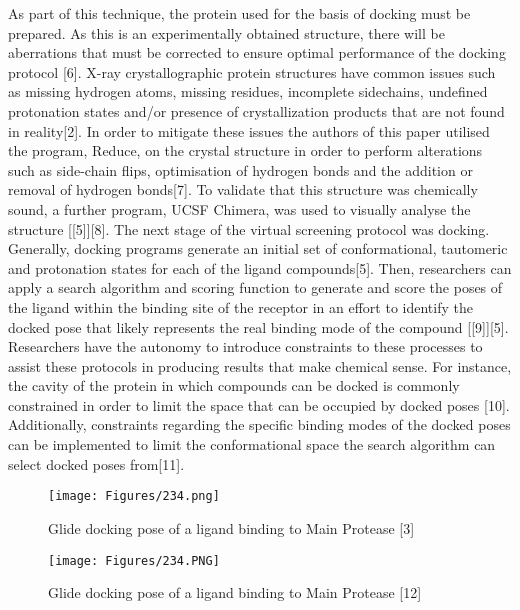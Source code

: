 \documentclass[
]{article}
\begin{document}
As part of this technique, the protein used for the basis of docking
must be prepared. As this is an experimentally obtained structure, there
will be aberrations that must be corrected to ensure optimal performance
of the docking protocol {[}6{]}. X-ray crystallographic protein
structures have common issues such as missing hydrogen atoms, missing
residues, incomplete sidechains, undefined protonation states and/or
presence of crystallization products that are not found in
reality{[}2{]}. In order to mitigate these issues the authors of this
paper utilised the program, Reduce, on the crystal structure in order to
perform alterations such as side-chain flips, optimisation of hydrogen
bonds and the addition or removal of hydrogen bonds{[}7{]}. To validate
that this structure was chemically sound, a further program, UCSF
Chimera, was used to visually analyse the structure
{[}{[}5{]}{]}{[}8{]}. The next stage of the virtual screening protocol
was docking. Generally, docking programs generate an initial set of
conformational, tautomeric and protonation states for each of the ligand
compounds{[}5{]}. Then, researchers can apply a search algorithm and
scoring function to generate and score the poses of the ligand within
the binding site of the receptor in an effort to identify the docked
pose that likely represents the real binding mode of the compound
{[}{[}9{]}{]}{[}5{]}. Researchers have the autonomy to introduce
constraints to these processes to assist these protocols in producing
results that make chemical sense. For instance, the cavity of the
protein in which compounds can be docked is commonly constrained in
order to limit the space that can be occupied by docked poses {[}10{]}.
Additionally, constraints regarding the specific binding modes of the
docked poses can be implemented to limit the conformational space the
search algorithm can select docked poses from{[}11{]}.

\begin{figure}[htp]
    \centering
    \texttt{[image: Figures/234.png]}
    \caption{Glide docking pose of a ligand binding to Main Protease [3]}
    \label{fig:spectra}
\end{figure}

\begin{figure}

{\centering \texttt{[image: Figures/234.PNG]}

}

\caption{Glide docking pose of a ligand binding to Main Protease
{[}12{]}}

\end{figure}
\end{document}
